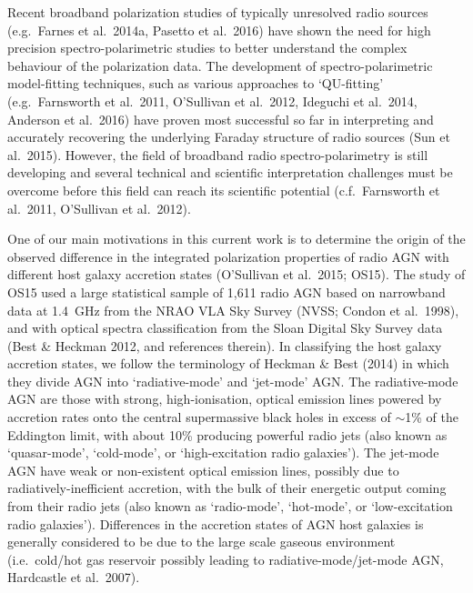 \documentclass{mnras}
\begin{document}
Recent broadband polarization studies of typically unresolved radio sources (e.g.~Farnes et al.~2014a, Pasetto et al.~2016) have shown the need for high precision spectro-polarimetric studies to better understand the complex behaviour of the polarization data. The development of spectro-polarimetric model-fitting techniques, such as various approaches to `QU-fitting' (e.g.~Farnsworth et al.~2011, O'Sullivan et al.~2012, Ideguchi et al.~2014, Anderson et al.~2016) have proven most successful so far in interpreting and accurately recovering the underlying Faraday structure of radio sources (Sun et al.~2015). 
However, the field of broadband radio spectro-polarimetry is still developing and several technical and scientific interpretation challenges must be overcome before this field can reach its scientific potential (c.f.~Farnsworth et al.~2011, O'Sullivan et al.~2012). 

One of our main motivations in this current work is to determine the origin of the observed difference in the integrated polarization properties of radio AGN with different host galaxy accretion states (O'Sullivan et al.~2015; OS15). The study of OS15 used a large statistical sample of 1,611 radio AGN based on narrowband data at 1.4~GHz from the NRAO VLA Sky Survey (NVSS; Condon et al.~1998), and with optical spectra classification from the Sloan Digital Sky Survey data (Best \& Heckman 2012, and references therein). In classifying the host galaxy accretion states, we follow the terminology of Heckman \& Best (2014) in which they divide AGN into `radiative-mode' and `jet-mode' AGN. The radiative-mode AGN are those with strong, high-ionisation, optical emission lines powered by accretion rates onto the central supermassive black holes in excess of $\sim$1\% of the Eddington limit, with about 10\% producing powerful radio jets (also known as `quasar-mode', `cold-mode', or `high-excitation radio galaxies'). The jet-mode AGN have weak or non-existent optical emission lines, possibly due to radiatively-inefficient accretion, with the bulk of their energetic output coming from their radio jets (also known as `radio-mode', `hot-mode', or `low-excitation radio galaxies'). Differences in the accretion states of AGN host galaxies is generally considered to be due to the large scale gaseous environment (i.e.~cold/hot gas reservoir possibly leading to radiative-mode/jet-mode AGN, Hardcastle et al.~2007). 
\end{document}
